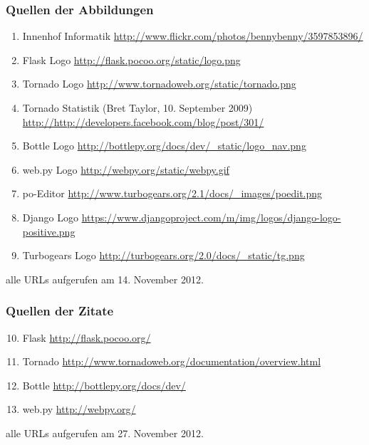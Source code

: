 \documentclass[
    t,
    smaller,
    compress,
    xcolor=svgnames,            %
    table,
]{beamer}
\begin{document}
\begin{frame}
  \frametitle{Quellen der Abbildungen}
  \footnotesize
  \begin{enumerate}[<1->]
    \item Innenhof Informatik
        \url{http://www.flickr.com/photos/bennybenny/3597853896/}       \label{illu:1}

   \item Flask Logo
        \url{http://flask.pocoo.org/static/logo.png}                    \label{illu:3}

    \item Tornado Logo
                \url{http://www.tornadoweb.org/static/tornado.png}              \label{illu:4}

    \item Tornado Statistik (Bret Taylor, 10. September 2009)
        \url{http://http://developers.facebook.com/blog/post/301/}      \label{illu:5}

    \item Bottle Logo
        \url{http://bottlepy.org/docs/dev/_static/logo_nav.png}             \label{illu:6}

    \item web.py Logo
        \url{http://webpy.org/static/webpy.gif}             \label{illu:7}
     \item po-Editor
        \url{http://www.turbogears.org/2.1/docs/_images/poedit.png}     \label{illu:8}
\item Django Logo
        \url{https://www.djangoproject.com/m/img/logos/django-logo-positive.png  }
\label{illu:9}
\item Turbogears Logo
        \url{http://turbogears.org/2.0/docs/_static/tg.png}
\label{illu:10}
  \end{enumerate}
  alle URLs aufgerufen am 14. November 2012.
\end{frame}

\begin{frame}
  \frametitle{Quellen der Zitate}
  \footnotesize
  \begin{enumerate}[<1->]
  \setcounter{enumi}{9}
    \item Flask
        \url{http://flask.pocoo.org/}       		
        \label{zit:1}
    \item Tornado
        \url{http://www.tornadoweb.org/documentation/overview.html}       
        \label{zit:2}
   	\item Bottle
        \url{http://bottlepy.org/docs/dev/}       
        \label{zit:3}
   	\item web.py
        \url{http://webpy.org/}       
        \label{zit:4}
           
  \end{enumerate}
  alle URLs aufgerufen am 27. November 2012.
  
\end{frame}
\end{document}
